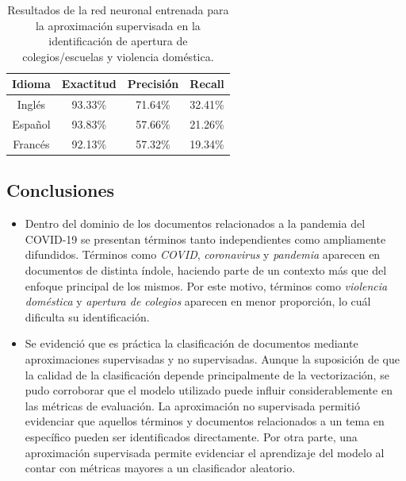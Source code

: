 \begin{table}[H]
    \centering
    \begin{tabular}{|c|c|c|c|}
        \textbf{Idioma} & \textbf{Exactitud} & \textbf{Precisión} & \textbf{Recall} \\ \hline
        Inglés & 93.33\% & 71.64\% & 32.41\% \\
        Español & 93.83\% & 57.66\% & 21.26\% \\
        Francés & 92.13\% & 57.32\% & 19.34\% \\
    \end{tabular}
    \caption{Resultados de la red neuronal entrenada para la aproximación supervisada en la identificación de apertura de colegios/escuelas y violencia doméstica.}
    \label{tab:dc_supervised_metrics_3}
\end{table}

\subsection{Conclusiones}
\begin{itemize}
    \item Dentro del dominio de los documentos relacionados a la pandemia del COVID-19 se presentan términos tanto independientes como ampliamente difundidos. Términos como \textit{COVID}, \textit{coronavirus} y \textit{pandemia} aparecen en documentos de distinta índole, haciendo parte de un contexto más que del enfoque principal de los mismos. Por este motivo, términos como \textit{violencia doméstica} y \textit{apertura de colegios} aparecen en menor proporción, lo cuál dificulta su identificación.
    
    \item Se evidenció que es práctica la clasificación de documentos mediante aproximaciones supervisadas y no supervisadas. Aunque la suposición de que la calidad de la clasificación depende principalmente de la vectorización, se pudo corroborar que el modelo utilizado puede influir considerablemente en las métricas de evaluación. La aproximación no supervisada permitió evidenciar que aquellos términos y documentos relacionados a un tema en específico pueden ser identificados directamente. Por otra parte, una aproximación supervisada permite evidenciar el aprendizaje del modelo al contar con métricas mayores a un clasificador aleatorio. 
\end{itemize}
